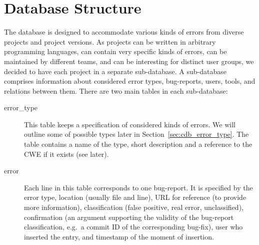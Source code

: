
\section{Database Structure}\label{sec:cdb_structure}

The database is designed to accommodate various kinds of errors from diverse
projects and project versions. As projects can be written in arbitrary
programming languages, can contain very specific kinds of errors, can be
maintained by different teams, and can be interesting for distinct user
groups, we decided to have each project %
in a separate sub-database. A sub-database comprises information about
considered error types, bug-reports, users, tools, and relations between
them. There are two main tables in each sub-database:
\begin{description}
\item[\textsf{error\_type}] This table keeps a specification of considered
  kinds of errors. We will outline some of possible types later in
  Section~\ref{sec:cdb_error_type}. The table contains a name of the type, short
  description and a reference to the CWE if it exists (see later).
\item[\textsf{error}] Each line in this table corresponds to one
  bug-report. It is specified by the error type, location (usually file and
  line), URL for reference (to provide more information), classification
  (false positive, real error, unclassified), confirmation (an argument
  supporting the validity of the bug-report classification, e.g.~a commit ID
  of the corresponding bug-fix), user who inserted the entry, and timestamp of
  the moment of insertion.
\end{description}

